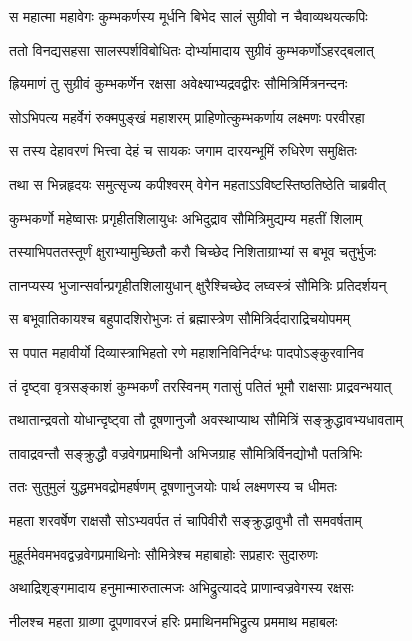 \twolineshloka
{स महात्मा महावेगः कुम्भकर्णस्य मूर्धनि}
{बिभेद सालं सुग्रीवो न चैवाव्यथयत्कपिः}


\twolineshloka
{ततो विनद्यसहसा सालस्पर्शविबोधितः}
{दोर्भ्यामादाय सुग्रीवं कुम्भकर्णोऽहरद्बलात्}


\twolineshloka
{ह्रियमाणं तु सुग्रीवं कुम्भकर्णेन रक्षसा}
{अवेक्ष्याभ्यद्रवद्वीरः सौमित्रिर्मित्रनन्दनः}


\twolineshloka
{सोऽभिपत्य महर्वेगं रुक्मपुङ्खं महाशरम्}
{प्राहिणोत्कुम्भकर्णाय लक्ष्मणः परवीरहा}


\twolineshloka
{स तस्य देहावरणं भित्त्वा देहं च सायकः}
{जगाम दारयन्भूमिं रुधिरेण समुक्षितः}


\twolineshloka
{तथा स भिन्नहृदयः समुत्सृज्य कपीश्वरम्}
{वेगेन महताऽऽविष्टस्तिष्ठतिष्ठेति चाब्रवीत्}


\twolineshloka
{कुम्भकर्णो महेष्वासः प्रगृहीतशिलायुधः}
{अभिदुद्राव सौमित्रिमुद्यम्य महतीं शिलाम्}


\twolineshloka
{तस्याभिपततस्तूर्णं क्षुराभ्यामुच्छितौ करौ}
{चिच्छेद निशिताग्राभ्यां स बभूव चतुर्भुजः}


\twolineshloka
{तानप्यस्य भुजान्सर्वान्प्रगृहीतशिलायुधान्}
{क्षुरैश्चिच्छेद लघ्वस्त्रं सौमित्रिः प्रतिदर्शयन्}


\twolineshloka
{स बभूवातिकायश्च बहुपादशिरोभुजः}
{तं ब्रह्मास्त्रेण सौमित्रिर्ददाराद्रिचयोपमम्}


\twolineshloka
{स पपात महावीर्यो दिव्यास्त्राभिहतो रणे}
{महाशनिविनिर्दग्धः पादपोऽङ्कुरवानिव}


\twolineshloka
{तं दृष्ट्वा वृत्रसङ्काशं कुम्भकर्णं तरस्विनम्}
{गतासुं पतितं भूमौ राक्षसाः प्राद्रवन्भयात्}


\twolineshloka
{तथातान्द्रवतो योधान्दृष्ट्वा तौ दूषणानुजौ}
{अवस्थाप्याथ सौमित्रिं सङ्क्रुद्धावभ्यधावताम्}


\twolineshloka
{तावाद्रवन्तौ सङ्क्रुद्धौ वज्रवेगप्रमाथिनौ}
{अभिजग्राह सौमित्रिर्विनद्योभौ पतत्रिभिः}


\twolineshloka
{ततः सुतुमुलं युद्धमभवद्रोमहर्षणम्}
{दूषणानुजयोः पार्थ लक्ष्मणस्य च धीमतः}


\twolineshloka
{महता शरवर्षेण राक्षसौ सोऽभ्यवर्पत}
{तं चापिवीरौ सङ्क्रुद्धावुभौ तौ समवर्षताम्}


\twolineshloka
{मुहूर्तमेवमभवद्वज्रवेगप्रमाथिनोः}
{सौमित्रेश्च महाबाहोः सप्रहारः सुदारुणः}


\twolineshloka
{अथाद्रिशृङ्गमादाय हनुमान्मारुतात्मजः}
{अभिद्रुत्याददे प्राणान्वज्रवेगस्य रक्षसः}


\twolineshloka
{नीलश्च महता ग्राव्णा दूपणावरजं हरिः}
{प्रमाथिनमभिद्रुत्य प्रममाथ महाबलः}


